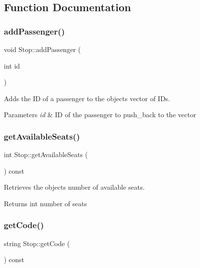 \subsection{Function Documentation}
\mbox{\label{group___stop_gac636e3c0c1e2794575bd3db14b5ee363}} 
\subsubsection{\texorpdfstring{add\+Passenger()}{addPassenger()}}
{\footnotesize\ttfamily void Stop\+::add\+Passenger (\begin{DoxyParamCaption}\item[{int}]{id }\end{DoxyParamCaption})}



Adds the ID of a passenger to the object\textquotesingle{}s vector of I\+Ds. 


\begin{DoxyParams}{Parameters}
{\em id} & ID of the passenger to push\+\_\+back to the vector \\
\hline
\end{DoxyParams}
\mbox{\label{group___stop_ga41d42147d1210ce72f15e31a8414e0ad}} 
\subsubsection{\texorpdfstring{get\+Available\+Seats()}{getAvailableSeats()}}
{\footnotesize\ttfamily int Stop\+::get\+Available\+Seats (\begin{DoxyParamCaption}{ }\end{DoxyParamCaption}) const}



Retrieves the object\textquotesingle{}s number of available seats. 

\begin{DoxyReturn}{Returns}
int number of seats 
\end{DoxyReturn}
\mbox{\label{group___stop_ga4c0a7bb72ca7a054a394d13fc8cd9bde}} 
\subsubsection{\texorpdfstring{get\+Code()}{getCode()}}
{\footnotesize\ttfamily string Stop\+::get\+Code (\begin{DoxyParamCaption}{ }\end{DoxyParamCaption}) const}



